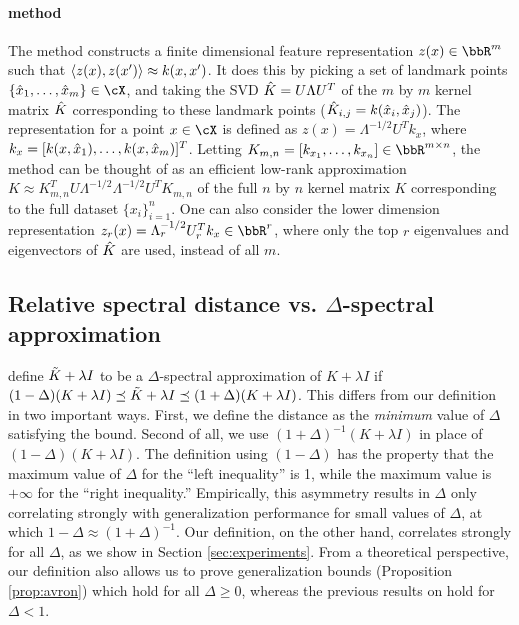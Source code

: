 \paragraph{\Nystrom method}
The \Nystrom method constructs a finite dimensional feature representation
$z(x) \in \RR^m$ such that $\left\langle z(x),z(x')\right\rangle \approx k(x,x')$.  It does this
by picking a set of landmark points $\{\hx_1,\ldots,\hx_m\} \in \cX$,
and taking the SVD $\hat{K} = U\Lambda U^T$ of the $m$ by $m$ 
kernel matrix $\hat{K}$ corresponding to these landmark points 
($\hat{K}_{i,j} = k(\hat{x}_i,\hat{x}_j)$).  The \Nystrom representation for a point $x \in \cX$
is defined as $z(x) = \Lambda^{-1/2} U^T k_x$, where $k_x = [k(x,\hat{x}_1),\ldots,k(x,\hat{x}_m)]^T$.
Letting $K_{m,n} = [k_{x_1},\ldots,k_{x_n}] \in \RR^{m\times n}$, 
the \Nystrom method can be thought of as an efficient low-rank approximation
$K \approx K_{m,n}^T U \Lambda^{-1/2}\Lambda^{-1/2} U^T K_{m,n}$ of the full
$n$ by $n$ kernel matrix $K$ corresponding to the full dataset $\{x_i\}_{i=1}^n$.
One can also consider the lower dimension \Nystrom representation
$z_r(x) = \Lambda_r^{-1/2} U_r^T k_x \in \RR^r$, where only the top $r$ eigenvalues and
eigenvectors of $\hat{K}$ are used, instead of all $m$.

\subsection{Relative spectral distance vs. $\Delta$-spectral approximation}
\citet{avron17} define $\tilde{K}+\lambda I$ to be a $\Delta$-spectral approximation of $K+\lambda I$ if $(1-\Delta)(K+\lambda I) \preceq \tilde{K} + \lambda I \preceq (1+\Delta)(K+\lambda I)$. This differs from our definition in two important ways. First, we define the distance as the \textit{minimum} value of $\Delta$ satisfying the bound.  Second of all, we use $(1+\Delta)^{-1}(K+\lambda I)$ in place of $(1-\Delta)(K+\lambda I)$. The definition using $(1-\Delta)$ has the property that the maximum value of $\Delta$ for the ``left inequality'' is 1, while the maximum value is $+\infty$ for the ``right inequality.'' Empirically, this asymmetry results in $\Delta$ only correlating strongly with generalization performance for small values of $\Delta$, at which $1-\Delta\approx (1+\Delta)^{-1}$. Our definition, on the other hand, correlates strongly for all $\Delta$, as we show in Section \ref{sec:experiments}.  From a theoretical perspective, our definition also allows us to prove generalization bounds (Proposition \ref{prop:avron}) which hold for all $\Delta \geq 0$, whereas the previous results on hold for $\Delta < 1$.


